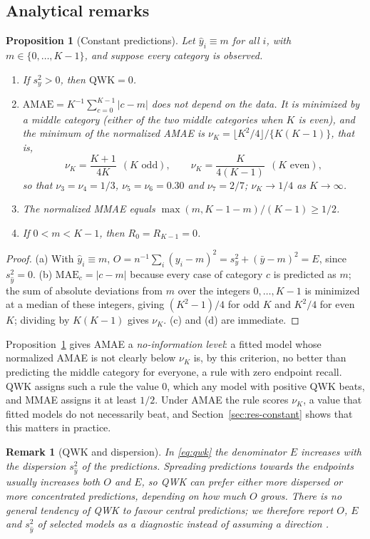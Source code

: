 \documentclass[pdflatex,sn-mathphys-ay]{sn-jnl}
\theoremstyle{thmstyleone}
\newtheorem{proposition}{Proposition}
\theoremstyle{thmstylethree}
\newtheorem{remark}{Remark}
\begin{document}
\subsection{Analytical remarks}

\begin{proposition}[Constant predictions]\label{prop:constant}
Let $\hat y_i\equiv m$ for all $i$, with $m\in\{0,\dots,K-1\}$, and suppose every category is observed.
\begin{enumerate}
\item[(a)] If $s_y^2>0$, then $\mathrm{QWK}=0$.
\item[(b)] $\mathrm{AMAE}=K^{-1}\sum_{c=0}^{K-1}|c-m|$ does not depend on the data. It is minimized by a middle category (either of the two middle categories when $K$ is even), and the minimum of the normalized AMAE is $\nu_K=\lfloor K^2/4\rfloor/\{K(K-1)\}$, that is,
\[
\nu_K=\frac{K+1}{4K}\ \ (K \text{ odd}),\qquad \nu_K=\frac{K}{4(K-1)}\ \ (K\text{ even}),
\]
so that $\nu_3=\nu_4=1/3$, $\nu_5=\nu_6=0.30$ and $\nu_7=2/7$; $\nu_K\to 1/4$ as $K\to\infty$.
\item[(c)] The normalized MMAE equals $\max(m,K-1-m)/(K-1)\ge 1/2$.
\item[(d)] If $0<m<K-1$, then $R_0=R_{K-1}=0$.
\end{enumerate}
\end{proposition}

\begin{proof}
(a) With $\hat y_i\equiv m$, $O=n^{-1}\sum_i(y_i-m)^2=s_y^2+(\bar y-m)^2=E$, since $s_{\hat y}^2=0$. (b) $\mathrm{MAE}_c=|c-m|$ because every case of category $c$ is predicted as $m$; the sum of absolute deviations from $m$ over the integers $0,\dots,K-1$ is minimized at a median of these integers, giving $(K^2-1)/4$ for odd $K$ and $K^2/4$ for even $K$; dividing by $K(K-1)$ gives $\nu_K$. (c) and (d) are immediate.
\end{proof}

Proposition~\ref{prop:constant} gives AMAE a \emph{no-information level}: a fitted model whose normalized AMAE is not clearly below $\nu_K$ is, by this criterion, no better than predicting the middle category for everyone, a rule with zero endpoint recall. QWK assigns such a rule the value 0, which any model with positive QWK beats, and MMAE assigns it at least $1/2$. Under AMAE the rule scores $\nu_K$, a value that fitted models do not necessarily beat, and Section~\ref{sec:res-constant} shows that this matters in practice.

\begin{remark}[QWK and dispersion]\label{rem:qwk}
In \eqref{eq:qwk} the denominator $E$ increases with the dispersion $s_{\hat y}^2$ of the predictions. Spreading predictions towards the endpoints usually increases both $O$ and $E$, so QWK can prefer either more dispersed or more concentrated predictions, depending on how much $O$ grows. There is no general tendency of QWK to favour central predictions; we therefore report $O$, $E$ and $s_{\hat y}^2$ of selected models as a diagnostic instead of assuming a direction \citep[see also][]{Warrens2012}.
\end{remark}
\end{document}
